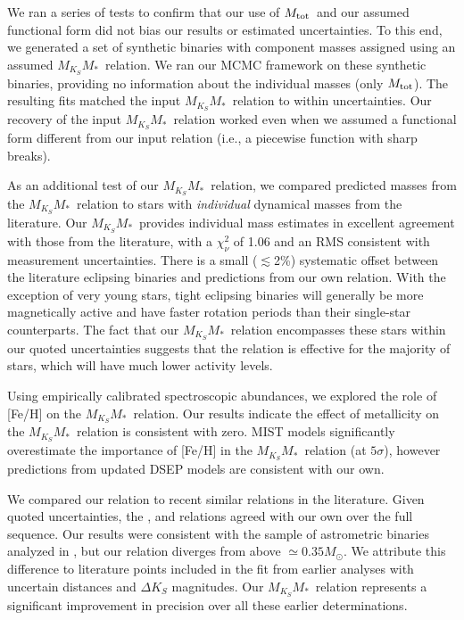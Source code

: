 \documentclass[twocolumn]{aastex62}
\newcommand{\mmk}{$M_{K_S}$\textendash$M_*$}
\newcommand{\mtot}{$M_{\rm{tot}}$}
\begin{document}
We ran a series of tests to confirm that our use of \mtot\ and our assumed functional form did not bias our results or estimated uncertainties. To this end, we generated a set of synthetic binaries with component masses assigned using an assumed \mmk\ relation. We ran our MCMC framework on these synthetic binaries, providing no information about the individual masses (only \mtot). The resulting fits matched the input \mmk\ relation to within uncertainties. Our recovery of the input \mmk\ relation worked even when we assumed a functional form different from our input relation (i.e., a piecewise function with sharp breaks). 

As an additional test of our \mmk\ relation, we compared predicted masses from the \mmk\ relation to stars with {\it individual} dynamical masses from the literature. Our \mmk\ provides individual mass estimates in excellent agreement with those from the literature, with a $\chi^2_\nu$ of 1.06 and an RMS consistent with measurement uncertainties. There is a small ($\lesssim$2\%) systematic offset between the literature eclipsing binaries and predictions from our own relation. With the exception of very young stars, tight eclipsing binaries will generally be more magnetically active and have faster rotation periods than their single-star counterparts. The fact that our \mmk\ relation encompasses these stars within our quoted uncertainties suggests that the relation is effective for the majority of stars, which will have much lower activity levels. 

Using empirically calibrated spectroscopic abundances, we explored the role of [Fe/H] on the \mmk\ relation. Our results indicate the effect of metallicity on the \mmk\ relation is consistent with zero. MIST models significantly overestimate the importance of [Fe/H] in the \mmk\ relation (at $5\sigma$), however predictions from updated DSEP models are consistent with our own. 

We compared our relation to recent similar relations in the literature. Given quoted uncertainties, the \citet{Hen1993}, \citet{Delfosse2000} and \citet{Mann2015b} relations agreed with our own over the full sequence. Our results were consistent with the sample of astrometric binaries analyzed in \citet{Benedict2016}, but our relation diverges from \citet{Benedict2016} above $\simeq0.35M_\odot$. We attribute this difference to literature points included in the \citet{Benedict2016} fit from earlier analyses with uncertain distances and $\Delta K_S$ magnitudes. Our \mmk\ relation represents a significant improvement in precision over all these earlier determinations. 
\end{document}
